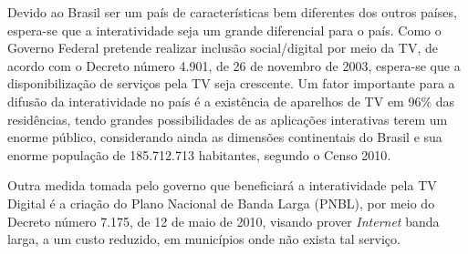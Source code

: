 Devido ao Brasil ser um país de características bem diferentes dos outros países, 
espera-se que a interatividade seja um grande diferencial para o país.
Como o Governo Federal pretende 
realizar inclusão social/digital por meio da TV, de acordo com o Decreto número 4.901, de 26 de novembro de 2003,
espera-se que a disponibilização de serviços pela TV seja crescente.
Um fator importante para a difusão da interatividade no país é a existência 
de aparelhos de TV em 96\% das residências\cite{ibge-pnad}, tendo grandes
possibilidades de as aplicações interativas terem um enorme público, considerando
ainda as dimensões continentais do Brasil e sua enorme população de 185.712.713 habitantes, segundo
o Censo 2010\cite{censo2010}.

Outra medida tomada pelo governo que beneficiará a interatividade pela TV Digital é a criação do 
Plano Nacional de Banda Larga (PNBL), por meio do Decreto número 7.175, de 12 de maio de 2010,
visando prover \textit{Internet} banda larga, a um custo reduzido, em municípios onde não exista tal serviço.


